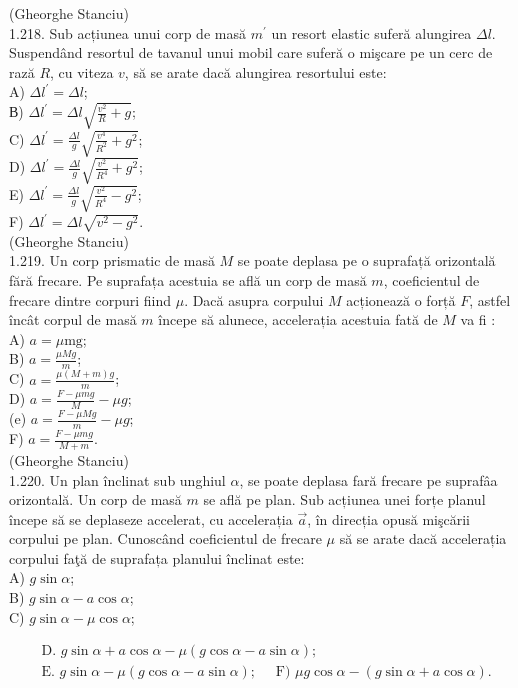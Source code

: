 \documentclass[10pt]{article}
\begin{document}
(Gheorghe Stanciu)\\
1.218. Sub acțiunea unui corp de masă $m^{\prime}$ un resort elastic suferă alungirea $\Delta l$. Suspendând resortul de tavanul unui mobil care suferă o mişcare pe un cerc de rază $R$, cu viteza $v$, să se arate dacă alungirea resortului este:\\
A) $\Delta l^{\prime}=\Delta l$;\\
В) $\Delta l^{\prime}=\Delta l \sqrt{\frac{v^{2}}{R}+g}$;\\
C) $\Delta l^{\prime}=\frac{\Delta l}{g} \sqrt{\frac{v^{4}}{R^{2}}+g^{2}}$;\\
D) $\Delta l^{\prime}=\frac{\Delta l}{g} \sqrt{\frac{v^{2}}{R^{4}}+g^{2}}$;\\
E) $\Delta l^{\prime}=\frac{\Delta l}{g} \sqrt{\frac{v^{2}}{R^{4}}-g^{2}}$;\\
F) $\Delta l^{\prime}=\Delta l \sqrt{v^{2}-g^{2}}$.\\
(Gheorghe Stanciu)\\
1.219. Un corp prismatic de masă $M$ se poate deplasa pe o suprafață orizontală fără frecare. Pe suprafața acestuia se află un corp de masă $m$, coeficientul de frecare dintre corpuri fiind $\mu$. Dacă asupra corpului $M$ acționează o forță $F$, astfel încât corpul de masă $m$ începe să alunece, accelerația acestuia fată de $M$ va fi :\\
A) $a=\mu \mathrm{mg}$;\\
B) $a=\frac{\mu M g}{m}$;\\
C) $a=\frac{\mu(M+m) g}{m}$;\\
D) $a=\frac{F-\mu m g}{M}-\mu g$;\\
(e) $a=\frac{F-\mu M g}{m}-\mu g$;\\
F) $a=\frac{F-\mu m g}{M+m}$.\\
(Gheorghe Stanciu)\\
1.220. Un plan înclinat sub unghiul $\alpha$, se poate deplasa fară frecare pe suprafâa orizontală. Un corp de masă $m$ se află pe plan. Sub acțiunea unei forțe planul începe să se deplaseze accelerat, cu accelerația $\vec{a}$, în direcția opusă mişcării corpului pe plan. Cunoscând coeficientul de frecare $\mu$ să se arate dacă accelerația corpului faţă de suprafața planului înclinat este:\\
A) $g \sin \alpha$;\\
B) $g \sin \alpha-a \cos \alpha$;\\
C) $g \sin \alpha-\mu \cos \alpha$;

$$
\begin{aligned}
& \text { D. } g \sin \alpha+a \cos \alpha-\mu(g \cos \alpha-a \sin \alpha) \text {; } \\
& \text { E. } g \sin \alpha-\mu(g \cos \alpha-a \sin \alpha) ; \quad \text { F) } \mu g \cos \alpha-(g \sin \alpha+a \cos \alpha) \text {. }
\end{aligned}
$$
\end{document}
